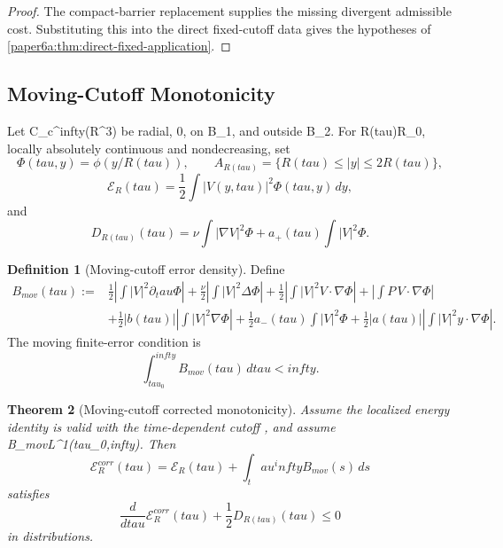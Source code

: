 \documentclass[11pt]{amsart}
\def\({}%
\def\){}%
\def\tilde#1{#1}%
\def\mathfrak#1{#1}%
\def\mathrm#1{#1}%
\def\mathbb#1{#1}%
\def\tau{tau}%
\def\infty{infty}%
\theoremstyle{plain}
\newtheorem{theorem}{Theorem}[section]
\theoremstyle{definition}
\newtheorem{definition}[theorem]{Definition}
\theoremstyle{remark}
\begin{document}
\begin{proof}
The compact-barrier replacement supplies the missing divergent admissible cost.
Substituting this into the direct fixed-cutoff data gives the hypotheses of
\cref{paper6a:thm:direct-fixed-application}.
\end{proof}

\subsection{Moving-Cutoff Monotonicity}

Let \(\phi\in C_c^\infty(\mathbb R^3)\) be radial, \(0\le\phi{}\),
\(\) on \(B_1\), and \(\) outside \(B_2\).  For
\(R(\tau)\ge R_0\), locally absolutely continuous and nondecreasing, set
\[
  \Phi(\tau,y)=\phi(y/R(\tau)),\qquad
  A_{R(\tau)}=\{R(\tau)\le |y|\le2R(\tau)\},
\]
\[
  \mathcal E_R(\tau)=\frac12\int |V(y,\tau)|^2\Phi(\tau,y)\,dy,
\]
and
\[
  \tilde{\mathfrak D}_{R(\tau)}(\tau)
  =
  \nu\int|\nabla V|^2\Phi
  +a_+(\tau)\int|V|^2\Phi .
\]

\begin{definition}[Moving-cutoff error density]\label{paper6a:def:moving-error-density}
Define
\begin{align*}
  B_{\mathrm{mov}}(\tau)
  :={}&
  \frac12\left|\int |V|^2\partial_\tau\Phi\right|
  +\frac{\nu}{2}\left|\int |V|^2\Delta\Phi\right|
  +\frac12\left|\int |V|^2V\cdot\nabla\Phi\right|
  +\left|\int P\,V\cdot\nabla\Phi\right|\\
  &+\frac12|b(\tau)|\left|\int |V|^2\nabla\Phi\right|
  +\frac12a_-(\tau)\int |V|^2\Phi
  +\frac12|a(\tau)|\left|\int |V|^2y\cdot\nabla\Phi\right|.
\end{align*}
The moving finite-error condition is
\[
  \int_{\tau_0}^{\infty}B_{\mathrm{mov}}(\tau)\,d\tau<\infty .
\]
\end{definition}

\begin{theorem}[Moving-cutoff corrected monotonicity]
\label{paper6a:thm:moving-corrected-monotonicity}
Assume the localized energy identity is valid with the time-dependent cutoff
\(\Phi\), and assume \(B_{\mathrm{mov}}\in L^1(\tau_0,\infty)\).  Then
\[
  \mathcal E_R^{\mathrm{corr}}(\tau)
  =
  \mathcal E_R(\tau)+\int_\tau^\infty B_{\mathrm{mov}}(s)\,ds
\]
satisfies
\[
  \frac{d}{d\tau}\mathcal E_R^{\mathrm{corr}}(\tau)
  +\frac12\tilde{\mathfrak D}_{R(\tau)}(\tau)\le0
\]
in distributions.
\end{theorem}
\end{document}
